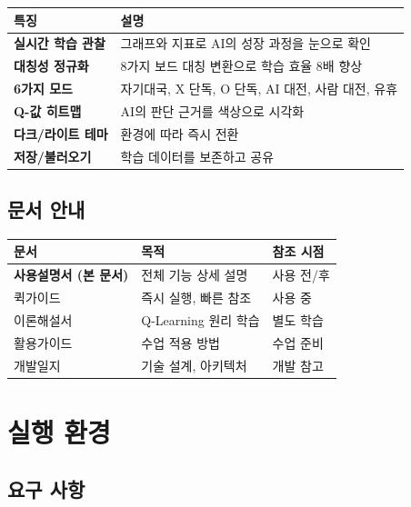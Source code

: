 \documentclass[11pt,a4paper]{article}
\begin{document}
\begin{center}
\renewcommand{\arraystretch}{1.4}
\begin{tabular}{|>{\bfseries}l|p{9cm}|}
\hline
\rowcolor{tableheader}
\textbf{특징} & \textbf{설명} \\
\hline
실시간 학습 관찰 & 그래프와 지표로 AI의 성장 과정을 눈으로 확인 \\
\hline
대칭성 정규화 & 8가지 보드 대칭 변환으로 학습 효율 8배 향상 \\
\hline
6가지 모드 & 자기대국, X 단독, O 단독, AI 대전, 사람 대전, 유휴 \\
\hline
Q-값 히트맵 & AI의 판단 근거를 색상으로 시각화 \\
\hline
다크/라이트 테마 & 환경에 따라 즉시 전환 \\
\hline
저장/불러오기 & 학습 데이터를 보존하고 공유 \\
\hline
\end{tabular}
\end{center}

\subsection{문서 안내}

\begin{center}
\renewcommand{\arraystretch}{1.4}
\begin{tabular}{|l|l|l|}
\hline
\rowcolor{tableheader}
\textbf{문서} & \textbf{목적} & \textbf{참조 시점} \\
\hline
\textbf{사용설명서 (본 문서)} & 전체 기능 상세 설명 & 사용 전/후 \\
\hline
퀵가이드 & 즉시 실행, 빠른 참조 & 사용 중 \\
\hline
이론해설서 & Q-Learning 원리 학습 & 별도 학습 \\
\hline
활용가이드 & 수업 적용 방법 & 수업 준비 \\
\hline
개발일지 & 기술 설계, 아키텍처 & 개발 참고 \\
\hline
\end{tabular}
\end{center}

\section{실행 환경}

\subsection{요구 사항}
\end{document}
